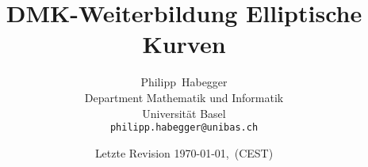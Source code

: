 \documentclass[a4paper,12pt,oneside]{scrbook}
\begin{document}
\title{DMK-Weiterbildung Elliptische Kurven}
\author{Philipp~Habegger \\ Department Mathematik und Informatik
 \\ Universität Basel \\ \texttt{philipp.habegger@unibas.ch}}
\date{Letzte Revision \today, \currenttime \,(CEST)}

\maketitle
\tableofcontents






\vfill\hfill\texttt{}
\end{document}
